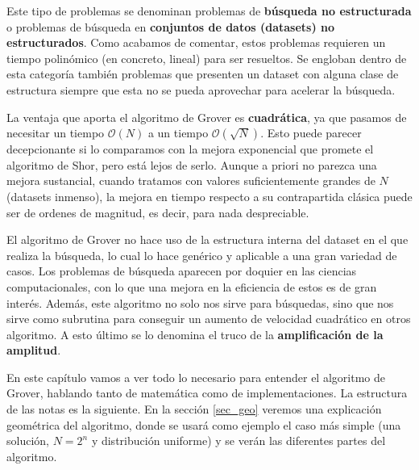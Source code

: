 \documentclass[a4paper,11pt]{book} %
\numberwithin{equation}{chapter}
\begin{document}
Este tipo de problemas se denominan problemas de \textbf{búsqueda no estructurada} o problemas de búsqueda en \textbf{conjuntos de datos (datasets) no estructurados}. Como acabamos de comentar, estos problemas requieren un tiempo polinómico (en concreto, lineal) para ser resueltos. Se engloban dentro de esta categoría también problemas que presenten un dataset con alguna clase de estructura siempre que esta no se pueda aprovechar para acelerar la búsqueda. 

La ventaja que aporta el algoritmo de Grover es \textbf{cuadrática}, ya que pasamos de necesitar un tiempo $\mathcal{O}(N)$ a un tiempo $\mathcal{O}(\sqrt{N})$. Esto puede parecer decepcionante si lo comparamos con la mejora exponencial que promete el algoritmo de Shor, pero está lejos de serlo.  Aunque a priori no parezca una mejora sustancial, cuando tratamos con valores suficientemente grandes de $N$ (datasets inmenso), la mejora en tiempo respecto a su contrapartida clásica puede ser de ordenes de magnitud, es decir, para nada despreciable. 

El algoritmo de Grover no hace uso de la estructura interna del dataset en el que realiza la búsqueda, lo cual lo hace genérico y aplicable a una gran variedad de casos. Los problemas de búsqueda aparecen por doquier en las ciencias computacionales, con lo que una mejora en la eficiencia de estos es de gran interés. Además, este algoritmo no solo nos sirve para búsquedas, sino que nos sirve como subrutina para conseguir un aumento de velocidad cuadrático en otros algoritmo. A esto último se lo denomina el truco de la \textbf{amplificación de la amplitud}.

En este capítulo vamos a ver todo lo necesario para entender el algoritmo de Grover, hablando tanto de matemática como de implementaciones. La estructura de las notas es la siguiente. En la sección \ref{sec_geo} veremos una explicación geométrica del algoritmo, donde se usará como ejemplo el caso más simple (una solución, $N=2^n$ y distribución uniforme) y se verán las diferentes partes del algoritmo. 
\end{document}
